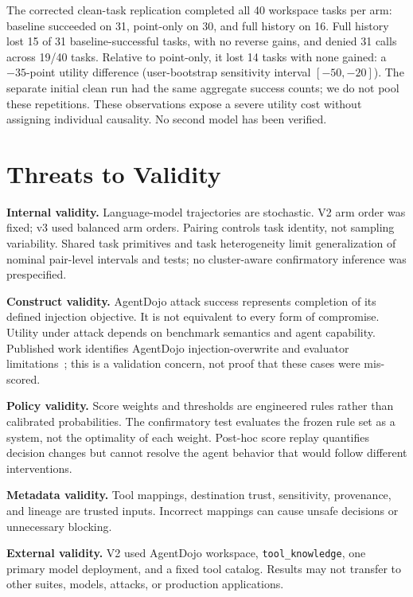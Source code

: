 \documentclass[conference,letterpaper,10pt]{IEEEtran}
\begin{document}
The corrected clean-task replication completed all 40 workspace tasks per arm: baseline succeeded on 31, point-only on 30, and full history on 16. Full history lost 15 of 31 baseline-successful tasks, with no reverse gains, and denied 31 calls across 19/40 tasks. Relative to point-only, it lost 14 tasks with none gained: a $-35$-point utility difference (user-bootstrap sensitivity interval $[-50,-20]$). The separate initial clean run had the same aggregate success counts; we do not pool these repetitions. These observations expose a severe utility cost without assigning individual causality. No second model has been verified.

\section{Threats to Validity}
\textbf{Internal validity.} Language-model trajectories are stochastic. V2 arm order was fixed; v3 used balanced arm orders. Pairing controls task identity, not sampling variability. Shared task primitives and task heterogeneity limit generalization of nominal pair-level intervals and tests; no cluster-aware confirmatory inference was prespecified.

\textbf{Construct validity.} AgentDojo attack success represents completion of its defined injection objective. It is not equivalent to every form of compromise. Utility under attack depends on benchmark semantics and agent capability. Published work identifies AgentDojo injection-overwrite and evaluator limitations~\cite{bhagwatkar2025firewalls}; this is a validation concern, not proof that these cases were mis-scored.

\textbf{Policy validity.} Score weights and thresholds are engineered rules rather than calibrated probabilities. The confirmatory test evaluates the frozen rule set as a system, not the optimality of each weight. Post-hoc score replay quantifies decision changes but cannot resolve the agent behavior that would follow different interventions.

\textbf{Metadata validity.} Tool mappings, destination trust, sensitivity, provenance, and lineage are trusted inputs. Incorrect mappings can cause unsafe decisions or unnecessary blocking.

\textbf{External validity.} V2 used AgentDojo workspace, \texttt{tool\_knowledge}, one primary model deployment, and a fixed tool catalog. Results may not transfer to other suites, models, attacks, or production applications.
\end{document}
